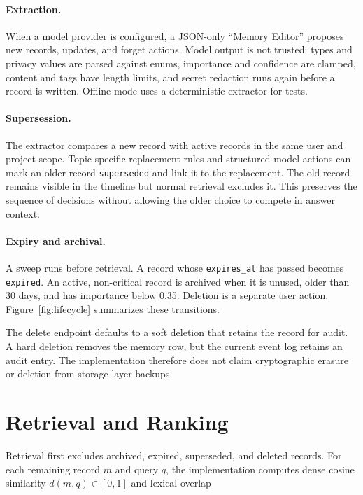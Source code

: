 \documentclass[11pt]{article}
\begin{document}
\paragraph{Extraction.}
When a model provider is configured, a JSON-only ``Memory Editor'' proposes new
records, updates, and forget actions. Model output is not trusted: types and
privacy values are parsed against enums, importance and confidence are clamped,
content and tags have length limits, and secret redaction runs again before a
record is written. Offline mode uses a deterministic extractor for tests.

\paragraph{Supersession.}
The extractor compares a new record with active records in the same user and
project scope. Topic-specific replacement rules and structured model actions
can mark an older record \texttt{superseded} and link it to the replacement.
The old record remains visible in the timeline but normal retrieval excludes
it. This preserves the sequence of decisions without allowing the older choice
to compete in answer context.

\paragraph{Expiry and archival.}
A sweep runs before retrieval. A record whose \texttt{expires\_at} has passed
becomes \texttt{expired}. An active, non-critical record is archived when it is
unused, older than 30 days, and has importance below 0.35. Deletion is a
separate user action. Figure~\ref{fig:lifecycle} summarizes these transitions.

The delete endpoint defaults to a soft deletion that retains the record for
audit. A hard deletion removes the memory row, but the current event log retains
an audit entry. The implementation therefore does not claim cryptographic
erasure or deletion from storage-layer backups.



\section{Retrieval and Ranking}
\label{sec:retrieval}

Retrieval first excludes archived, expired, superseded, and deleted records.
For each remaining record $m$ and query $q$, the implementation computes dense
cosine similarity $d(m,q)\in[0,1]$ and lexical overlap
\end{document}
